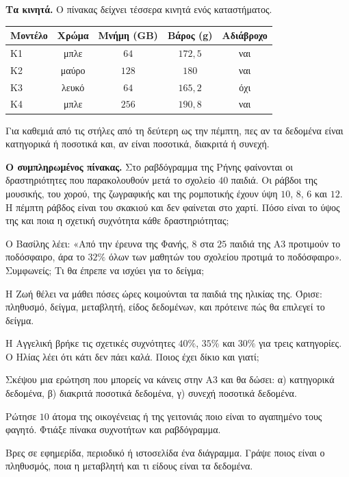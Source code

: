 \ex \textbf{Τα κινητά.} Ο πίνακας δείχνει τέσσερα κινητά ενός καταστήματος.
\begin{center}
\renewcommand{\arraystretch}{1.2}
\begin{tabular}{lcccc}
\toprule
\textbf{Μοντέλο} & \textbf{Χρώμα} & \textbf{Μνήμη (GB)} & \textbf{Βάρος (g)} & \textbf{Αδιάβροχο}\\
\midrule
Κ1 & μπλε & $64$ & $172{,}5$ & ναι\\
Κ2 & μαύρο & $128$ & $180$ & ναι\\
Κ3 & λευκό & $64$ & $165{,}2$ & όχι\\
Κ4 & μπλε & $256$ & $190{,}8$ & ναι\\
\bottomrule
\end{tabular}
\end{center}
Για καθεμιά από τις στήλες από τη δεύτερη ως την πέμπτη, πες αν τα δεδομένα είναι κατηγορικά ή ποσοτικά και, αν είναι ποσοτικά, διακριτά ή συνεχή.

\ex \textbf{Ο συμπληρωμένος πίνακας.} Στο ραβδόγραμμα της Ρήνης φαίνονται οι δραστηριότητες που παρακολουθούν μετά το σχολείο $40$ παιδιά. Οι ράβδοι της μουσικής, του χορού, της ζωγραφικής και της ρομποτικής έχουν ύψη $10$, $8$, $6$ και $12$. Η πέμπτη ράβδος είναι του σκακιού και δεν φαίνεται στο χαρτί. Πόσο είναι το ύψος της και ποια η σχετική συχνότητα κάθε δραστηριότητας;


\ex Ο Βασίλης λέει: «Από την έρευνα της Φανής, $8$ στα $25$ παιδιά της Α$3$ προτιμούν το ποδόσφαιρο, άρα το $32\%$ όλων των μαθητών του σχολείου προτιμά το ποδόσφαιρο». Συμφωνείς; Τι θα έπρεπε να ισχύει για το δείγμα;

\ex Η Ζωή θέλει να μάθει πόσες ώρες κοιμούνται τα παιδιά της ηλικίας της. Όρισε: πληθυσμό, δείγμα, μεταβλητή, είδος δεδομένων, και πρότεινε πώς θα επιλεγεί το δείγμα.

\ex Η Αγγελική βρήκε τις σχετικές συχνότητες $40\%$, $35\%$ και $30\%$ για τρεις κατηγορίες. Ο Ηλίας λέει ότι κάτι δεν πάει καλά. Ποιος έχει δίκιο και γιατί;

\ex Σκέψου μια ερώτηση που μπορείς να κάνεις στην Α$3$ και θα δώσει: α) κατηγορικά δεδομένα, β) διακριτά ποσοτικά δεδομένα, γ) συνεχή ποσοτικά δεδομένα.


\ex Ρώτησε $10$ άτομα της οικογένειας ή της γειτονιάς ποιο είναι το αγαπημένο τους φαγητό. Φτιάξε πίνακα συχνοτήτων και ραβδόγραμμα.

\ex Βρες σε εφημερίδα, περιοδικό ή ιστοσελίδα ένα διάγραμμα. Γράψε ποιος είναι ο πληθυσμός, ποια η μεταβλητή και τι είδους είναι τα δεδομένα.
